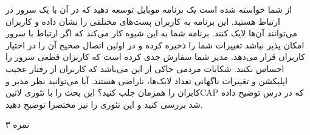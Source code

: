 \documentclass[../main.tex]{subfiles}
\begin{document}

از شما خواسته شده است یک برنامه موبایل توسعه دهید که در آن با یک سرور در ارتباط هستید. این برنامه به کاربران پست‌های مختلفی را نشان داده و کاربران می‌توانند آن‌ها لایک کنند.
برنامه شما به این شیوه کار می‌کند که اگر ارتباط با سرور امکان پذیر نباشد تغییرات شما را ذخیره کرده و در اولین اتصال صحیح آن را در اختیار کاربران قرار می‌دهد.
مدیر شما سفارش جدی کرده است که کاربران قطعی سرور را احساس نکنند.
شکایات مردمی حاکی از این می‌باشد که کاربران از رفتار عجیب اپلیکشن و تغییرات ناگهانی تعداد لایک‌ها، ناراضی هستند.
آیا می‌توانید نظر مدیر و کابران را همزمان جلب کنید؟ این بحث را با تئوری ‌لاتین{CAP} که در درس توضیح داده شد بررسی کنید و این تئوری را نیز مختصرا توضیح دهید.

۳ نمره
\end{document}
